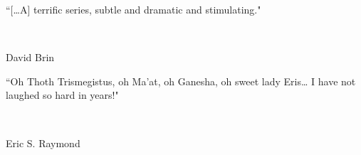\makeatletter
\newlength{\beforeblurbskip}
  \setlength{\beforeblurbskip}{.5\baselineskip}
\newlength{\afterblurbskip}
  \setlength{\afterblurbskip}{.5\baselineskip}
\newlength{\blurbwidth}
  \setlength{\blurbwidth}{.6\textwidth}
\newlength{\blurbrule}
  \setlength{\blurbrule}{.4\p@}
\newcommand{\blurbsize}{\small}
\newcommand{\blurbflush}{flushright}

\newcommand{\blurbfontsize}[1]{\def\blurbsize{#1}}
\newcommand{\blurbposition}[1]{\long\def\blurbflush{#1}}
\newcommand{\blurbtextposition}[1]{\def\textflush{#1}}
\newcommand{\blurbsourceposition}[1]{\def\sourceflush{#1}}

\newcommand{\@blurbrule}{\rule[.5ex]{\blurbwidth}{\blurbrule}}

\newcommand{\@blurbtext}[1]{%
  \begin{minipage}{\blurbwidth}\begin{\textflush} #1\par
    \ifdim\blurbrule>\z@ \@blurbrule \else \vspace*{1ex} \fi
  \end{\textflush}\end{minipage}}

  \newcommand{\@blurbsource}[1]{%
  \begin{minipage}{\blurbwidth}
    \begin{\sourceflush} #1\par
  \end{\sourceflush}\end{minipage}}

\newcommand{\blurb}[2]{
	\vspace{\beforeblurbskip}
	{\blurbsize
	\begin{\blurbflush}
		\begin{minipage}{8cm} \@blurbtext{#1}\\ \@blurbsource{#2} \end{minipage}
	\end{\blurbflush}
	\vspace{\afterblurbskip}}}
\makeatother

\thispagestyle{empty}
\blurb{``[{\ldots}A] terrific series, subtle and dramatic and stimulating."}{David Brin}
\blurb{``Oh Thoth Trismegistus, oh Ma'at, oh Ganesha, oh sweet lady Eris{\ldots} I have not laughed so hard in years!"}{Eric S. Raymond}
\thispagestyle{empty}
